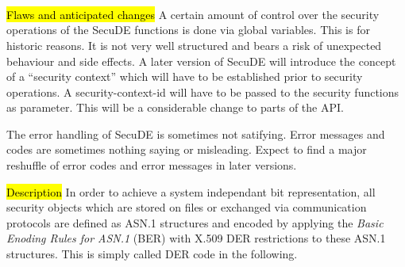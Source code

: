  \\
 \\
 \\
 \\
 \\
 \\
 \\
 \\
 \\
 \\
 \\
 \\
 \\

\hl{Flaws and anticipated changes}
A certain amount of control over the security operations of the SecuDE
functions is done via global variables. This is for historic reasons.
It is not very well structured
and bears a risk of unexpected behaviour and side effects. A later version of SecuDE
will introduce the concept of a  ``security context'' which will have 
to be established prior to security operations. A security-context-id will have to be passed
to the security functions as parameter. This will be a considerable change
to parts of the API.

The error handling of SecuDE is sometimes not satifying. Error messages and codes
are sometimes nothing saying or misleading. Expect to find a major reshuffle
of error codes and error messages in later versions.

\label{intro4}
\hl{Description}
In order to achieve a system independant bit representation, all security 
objects 
which are stored on files or exchanged via communication protocols are 
defined as ASN.1 structures and encoded by applying
the {\em Basic Enoding Rules for ASN.1} (BER) with X.509 DER restrictions 
to these 
ASN.1 structures. This is simply called DER code in the following. 

